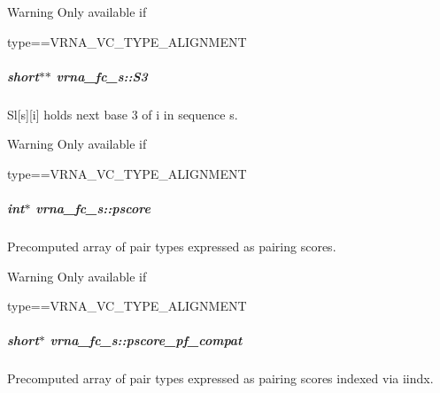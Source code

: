 \begin{DoxyWarning}{Warning}
Only available if\begin{DoxyVerb}type==VRNA_VC_TYPE_ALIGNMENT \end{DoxyVerb}
 
\end{DoxyWarning}
\hypertarget{group__fold__compound_af6ab2a25b84d2308ee23f6b11b5fd52d}{}
\subparagraph[{S3}]{\setlength{\rightskip}{0pt plus 5cm}short$\ast$$\ast$ vrna\+\_\+fc\+\_\+s\+::\+S3}\label{group__fold__compound_af6ab2a25b84d2308ee23f6b11b5fd52d}


Sl\mbox{[}s\mbox{]}\mbox{[}i\mbox{]} holds next base 3\textquotesingle{} of i in sequence s. 

\begin{DoxyWarning}{Warning}
Only available if\begin{DoxyVerb}type==VRNA_VC_TYPE_ALIGNMENT \end{DoxyVerb}
 
\end{DoxyWarning}
\hypertarget{group__fold__compound_a14dc7755af6019ddbd0cf94b209e89dd}{}
\subparagraph[{pscore}]{\setlength{\rightskip}{0pt plus 5cm}int$\ast$ vrna\+\_\+fc\+\_\+s\+::pscore}\label{group__fold__compound_a14dc7755af6019ddbd0cf94b209e89dd}


Precomputed array of pair types expressed as pairing scores. 

\begin{DoxyWarning}{Warning}
Only available if\begin{DoxyVerb}type==VRNA_VC_TYPE_ALIGNMENT \end{DoxyVerb}
 
\end{DoxyWarning}
\hypertarget{group__fold__compound_abf5e82d14649b6179ae60ed7da6e4fc0}{}
\subparagraph[{pscore\+\_\+pf\+\_\+compat}]{\setlength{\rightskip}{0pt plus 5cm}short$\ast$ vrna\+\_\+fc\+\_\+s\+::pscore\+\_\+pf\+\_\+compat}\label{group__fold__compound_abf5e82d14649b6179ae60ed7da6e4fc0}


Precomputed array of pair types expressed as pairing scores indexed via iindx. 

